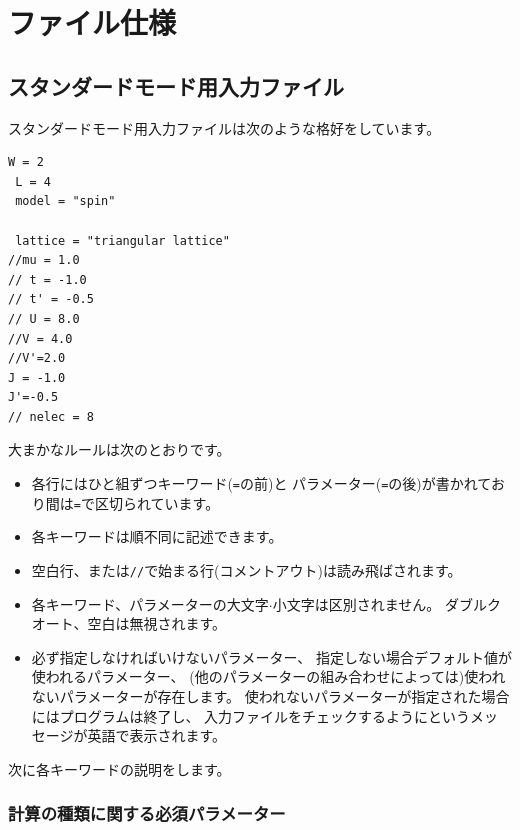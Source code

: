 \chapter{ファイル仕様}

\section{スタンダードモード用入力ファイル}
\label{Ch:HowToStandard}

スタンダードモード用入力ファイルは次のような格好をしています。

\begin{minipage}{10cm}
\begin{screen}
\begin{verbatim}
W = 2
 L = 4
 model = "spin"

 lattice = "triangular lattice"
//mu = 1.0
// t = -1.0
// t' = -0.5
// U = 8.0
//V = 4.0
//V'=2.0
J = -1.0
J'=-0.5
// nelec = 8
\end{verbatim}
\end{screen}
\end{minipage}

大まかなルールは次のとおりです。
\begin{itemize}
\item 各行にはひと組ずつキーワード(\verb|=|の前)と
  パラメーター(\verb|=|の後)が書かれており間は\verb|=|で区切られています。
\item 各キーワードは順不同に記述できます。
\item 空白行、または\verb|//|で始まる行(コメントアウト)は読み飛ばされます。
\item 各キーワード、パラメーターの大文字$\cdot$小文字は区別されません。
  ダブルクオート、空白は無視されます。
\item 必ず指定しなければいけないパラメーター、
  指定しない場合デフォルト値が使われるパラメーター、
  (他のパラメーターの組み合わせによっては)使われないパラメーターが存在します。
  使われないパラメーターが指定された場合にはプログラムは終了し、
  入力ファイルをチェックするようにというメッセージが英語で表示されます。
\end{itemize}

次に各キーワードの説明をします。

\subsection{計算の種類に関する必須パラメーター}


